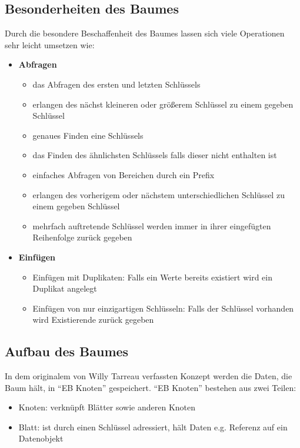 \documentclass[a4paper,11pt,oneside,%
headsepline,												%
footsepline,												%
bibtotocnumbered									%
]{scrreprt}
\begin{document}
\subsection{Besonderheiten des Baumes}
Durch die besondere Beschaffenheit des Baumes lassen sich viele Operationen sehr leicht umsetzen wie:
\begin{itemize}
	\item \textbf{Abfragen}
	\begin{itemize}
		\item das Abfragen des ersten und letzten Schlüssels
		\item erlangen des nächst kleineren oder größerem Schlüssel zu einem gegeben Schlüssel
		\item genaues Finden eine Schlüssels
		\item das Finden des ähnlichsten Schlüssels falls dieser nicht enthalten ist
		\item einfaches Abfragen von Bereichen durch ein Prefix
		\item erlangen des vorherigem oder nächstem unterschiedlichen Schlüssel zu einem gegeben Schlüssel
		\item mehrfach auftretende Schlüssel werden immer in ihrer eingefügten Reihenfolge zurück gegeben
	\end{itemize}
	\item \textbf{Einfügen}
	\begin{itemize}
		\item Einfügen mit Duplikaten: Falls ein Werte bereits existiert wird ein Duplikat angelegt
		\item Einfügen von nur einzigartigen Schlüsseln: Falls der Schlüssel vorhanden wird Existierende zurück gegeben
	\end{itemize}
\end{itemize}


\subsection{Aufbau des Baumes}
In dem originalem von Willy Tarreau verfassten Konzept\autocite[Absatz Definitions]{Tarreau} werden die Daten, die Baum hält, in \enquote{EB Knoten}
gespeichert. \enquote{EB Knoten} bestehen aus zwei Teilen:
\begin{itemize}
\item Knoten: verknüpft Blätter sowie anderen Knoten
\item Blatt: ist durch einen Schlüssel adressiert, hält Daten e.g. Referenz auf ein Datenobjekt
\end{itemize}
\end{document}
